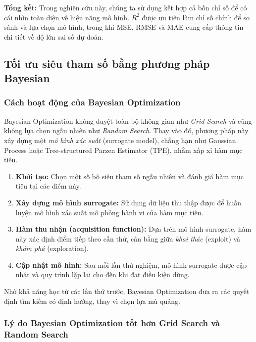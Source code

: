 \documentclass[12pt,a4paper]{article}
\begin{document}
\vspace{0.3cm}
\noindent\textbf{Tổng kết:} Trong nghiên cứu này, chúng ta sử dụng kết hợp cả bốn chỉ số để có cái nhìn toàn diện về hiệu năng mô hình. $R^2$ được ưu tiên làm chỉ số chính để so sánh và lựa chọn mô hình, trong khi MSE, RMSE và MAE cung cấp thông tin chi tiết về độ lớn sai số dự đoán.


\subsection{Tối ưu siêu tham số bằng phương pháp Bayesian}
\subsubsection{Cách hoạt động của Bayesian Optimization}

Bayesian Optimization không duyệt toàn bộ không gian như \textit{Grid Search} và cũng không lựa chọn ngẫu nhiên như \textit{Random Search}. Thay vào đó, phương pháp này xây dựng một \textit{mô hình xác suất} (surrogate model), chẳng hạn như Gaussian Process hoặc Tree-structured Parzen Estimator (TPE), nhằm xấp xỉ hàm mục tiêu.
\begin{enumerate}
    \item \textbf{Khởi tạo:} Chọn một số bộ siêu tham số ngẫu nhiên và đánh giá hàm mục tiêu tại các điểm này.
    \item \textbf{Xây dựng mô hình surrogate:} Sử dụng dữ liệu thu thập được để huấn luyện mô hình xác suất mô phỏng hành vi của hàm mục tiêu.
    \item \textbf{Hàm thu nhận (acquisition function):} Dựa trên mô hình surrogate, hàm này xác định điểm tiếp theo cần thử, cân bằng giữa \textit{khai thác} (exploit) và \textit{khám phá} (exploration).
    \item \textbf{Cập nhật mô hình:} Sau mỗi lần thử nghiệm, mô hình surrogate được cập nhật và quy trình lặp lại cho đến khi đạt điều kiện dừng.
\end{enumerate}

Nhờ khả năng học từ các lần thử trước, Bayesian Optimization đưa ra các quyết định tìm kiếm có định hướng, thay vì chọn lựa mù quáng.

\subsubsection{Lý do Bayesian Optimization tốt hơn Grid Search và Random Search}
\end{document}
